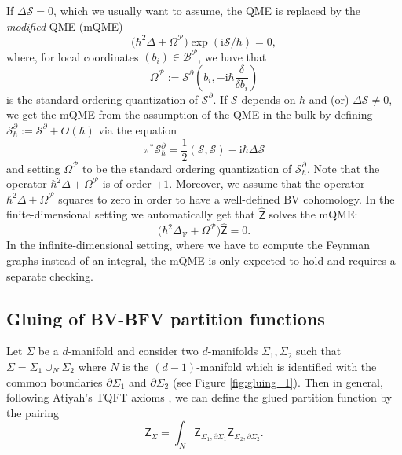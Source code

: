 \documentclass[11pt,colorinlistoftodos]{amsart}
\numberwithin{equation}{subsection}
\theoremstyle{plain}
\theoremstyle{definition}
\theoremstyle{remark}
\newcommand{\de}{\partial}
\newcommand{\calB}{\mathcal{B}}
\newcommand{\calS}{\mathcal{S}}
\newcommand{\calP}{\mathcal{P}}
\let\Hat=\widehat
\newcommand{\I}{\mathrm{i}}
\newcommand{\calV}{\mathcal{V}}
\begin{document}
If $\Delta\calS=0$, which we usually want to assume, the QME is replaced by the \emph{modified} QME (mQME) 
\begin{equation}
\label{eq:mQME_1}
\big(\hbar^2\Delta+\Omega^\calP\big)\exp\left(\I\calS/\hbar\right)=0,
\end{equation}
where, for local coordinates $(b_i)\in\calB^\calP$, we have that 
\[
\Omega^\calP:=\calS^\de\left(b_i,-\I\hbar\frac{\delta}{\delta b_i}\right)
\]
is the standard ordering quantization of $\calS^\de$. 
If $\calS$ depends on $\hbar$ and (or) $\Delta\calS\not=0$, we get the mQME from the assumption of the QME in the bulk by defining $\calS^\de_\hbar:=\calS^\de+O(\hbar)$ via the equation
\[
\pi^*\calS^\de_\hbar=\frac{1}{2}(\calS,\calS)-\I\hbar\Delta\calS
\]
and setting $\Omega^\calP$ to be the standard ordering quantization of $\calS^\de_\hbar$.
Note that the operator $\hbar^2\Delta+\Omega^\calP$ is of order $+1$. 
Moreover, we assume that the operator $\hbar^2\Delta+\Omega^\calP$ squares to zero in order to have a well-defined BV cohomology. In the finite-dimensional setting we automatically get that $\Hat{\mathsf{Z}}$ solves the mQME: 
\begin{equation}
\label{eq:mQME_2}
    \big(\hbar^2\Delta_\calV+\Omega^\calP\big)\Hat{\mathsf{Z}}=0.
\end{equation}
In the infinite-dimensional setting, where we have to compute the Feynman graphs instead of an integral, the mQME is only expected to hold and requires a separate checking. 

\subsection{Gluing of BV-BFV partition functions}
Let $\Sigma$ be a $d$-manifold and consider two $d$-manifolds $\Sigma_1,\Sigma_2$ such that $\Sigma=\Sigma_1\cup_{N}\Sigma_2$ where $N$ is the $(d-1)$-manifold which is identified with the common boundaries $\de\Sigma_1$ and $\de\Sigma_2$ (see Figure \ref{fig:gluing_1}). Then in general, following Atiyah's TQFT axioms \cite{Atiyah1988}, we can define the glued partition function by the pairing
\begin{equation}
\label{eq:gluing_general}
\mathsf{Z}_{\Sigma}=\int_N \mathsf{Z}_{\Sigma_1,\de\Sigma_1}\mathsf{Z}_{\Sigma_2,\de\Sigma_2}.
\end{equation}
\end{document}
